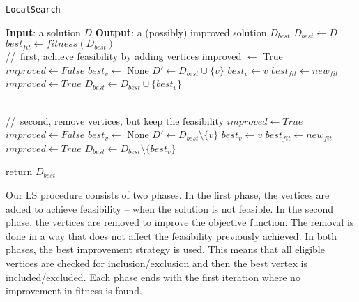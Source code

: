 \documentclass[dvipsnames,format=sigconf,anonymous=true,review=true]{acmart}
\begin{document}
  \begin{algorithm}[!t] 
  	\caption{\texttt{LocalSearch}}\label{alg:ls}
  	\begin{algorithmic}[1]
  		\STATE \textbf{Input}: a solution $D$
  		\STATE \textbf{Output}: a (possibly) improved solution $D_{best}$
  		\STATE $D_{best} \gets D$
  		\STATE $best_{fit} \gets fitness(D_{best})$
 		\\//\, first, achieve feasibility by adding vertices
 		\STATE improved $\gets$ True
  		     \STATE $improved \gets  False$
  		     \STATE $best_{v} \gets$ None
  		          \STATE $D' \gets D_{best} \cup \{v\}$
  		              \STATE $best_v \gets v$
  		              \STATE $best_{fit} \gets new_{fit}$
  		              \STATE $improved \gets True$
  		          \ENDIF
  		     \ENDFOR
  		         \STATE $D_{best} \gets D_{best} \cup \{best_v\}$
  		     \ENDIF

  		\ENDWHILE   	
  		\\ //\, second, remove vertices, but keep the feasibility	    
  		 \STATE  $improved \gets True$
  		   \STATE $improved \gets  False$
  		    \STATE $best_{v} \gets$ None
  		       \STATE $D' \gets D_{best} \setminus \{v\}$
  		             \STATE $best_v \gets v$
  		             \STATE $best_{fit} \gets new_{fit}$	              
  		             \STATE $improved \gets True$
  		       \ENDIF
  		      		 \STATE $D_{best} \gets D_{best} \setminus \{best_v\}$
  		       \ENDIF
  		       
  		    \ENDFOR
  		\ENDWHILE
  		\STATE return $D_{best}$
  	\end{algorithmic}
\end{algorithm}

Our LS procedure consists of two phases. In the first phase, the vertices are added to achieve feasibility -- when the solution is not feasible. In the second phase, the vertices are removed to improve the objective function. The removal is done in a way that does not affect the feasibility previously achieved. 
In both phases, the best improvement strategy is used. This means that all eligible vertices are checked for inclusion/exclusion and then the best vertex is included/excluded. 
Each phase ends with the first iteration where no improvement in fitness is found.  
\end{document}
